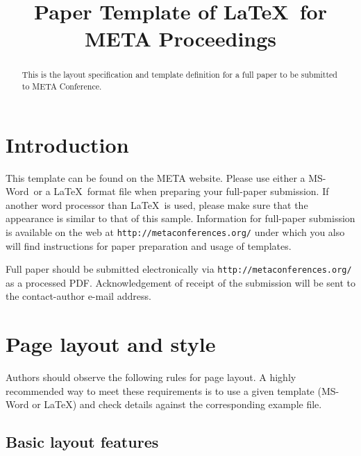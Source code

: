 \documentclass{article}
\title{Paper Template of \LaTeX\ for META Proceedings} %
\begin{document}
\maketitle

%
\begin{abstract}
This is the layout specification and template definition for a full paper to be submitted to META Conference.
\end{abstract}

%
\section{Introduction}

This template can be found on the META website. 
Please use either a MS-Word\textregistered\ or a \LaTeX\ format file when preparing your full-paper submission. 
If another word processor than \LaTeX\ is used, please make sure that the appearance is similar to that of this sample.
Information for full-paper submission is available on the web at {\tt \small http://metaconferences.org/} under which you also will find instructions for paper preparation and usage of templates.

Full paper should be submitted electronically via {\tt \small http://metaconferences.org/} as a processed PDF. 
Acknowledgement of receipt of the submission will be sent to the contact-author e-mail address.

\section{Page layout and style}

Authors should observe the following rules for page layout. 
A highly recommended way to meet these requirements is to use a given template (MS-Word or \LaTeX) and check details against the corresponding example file.

\subsection{Basic layout features}
\end{document}
